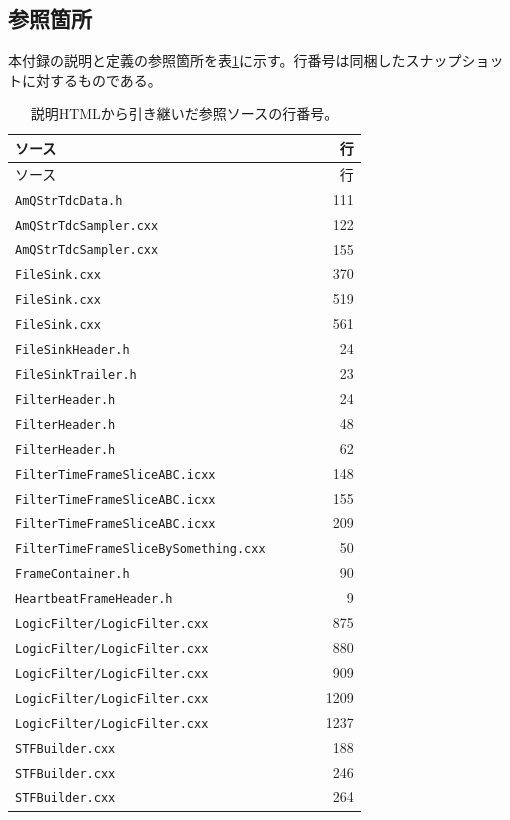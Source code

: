\subsection{参照箇所}
本付録の説明と定義の参照箇所を表\ref{tab:format-source-lines}に示す。行番号は同梱したスナップショットに対するものである。
{\footnotesize\begin{longtable}{p{0.70\linewidth}r}\caption{説明HTMLから引き継いだ参照ソースの行番号。}\label{tab:format-source-lines}\\\hline ソース & 行 \\ \hline\endfirsthead\hline ソース & 行 \\ \hline\endhead
\texttt{AmQStrTdcData.h} & 111 \\
\texttt{AmQStrTdcSampler.cxx} & 122 \\
\texttt{AmQStrTdcSampler.cxx} & 155 \\
\texttt{FileSink.cxx} & 370 \\
\texttt{FileSink.cxx} & 519 \\
\texttt{FileSink.cxx} & 561 \\
\texttt{FileSinkHeader.h} & 24 \\
\texttt{FileSinkTrailer.h} & 23 \\
\texttt{FilterHeader.h} & 24 \\
\texttt{FilterHeader.h} & 48 \\
\texttt{FilterHeader.h} & 62 \\
\texttt{FilterTimeFrameSliceABC.icxx} & 148 \\
\texttt{FilterTimeFrameSliceABC.icxx} & 155 \\
\texttt{FilterTimeFrameSliceABC.icxx} & 209 \\
\texttt{FilterTimeFrameSliceBySomething.cxx} & 50 \\
\texttt{FrameContainer.h} & 90 \\
\texttt{HeartbeatFrameHeader.h} & 9 \\
\texttt{LogicFilter/LogicFilter.cxx} & 875 \\
\texttt{LogicFilter/LogicFilter.cxx} & 880 \\
\texttt{LogicFilter/LogicFilter.cxx} & 909 \\
\texttt{LogicFilter/LogicFilter.cxx} & 1209 \\
\texttt{LogicFilter/LogicFilter.cxx} & 1237 \\
\texttt{STFBuilder.cxx} & 188 \\
\texttt{STFBuilder.cxx} & 246 \\
\texttt{STFBuilder.cxx} & 264 \\

\end{longtable}}
